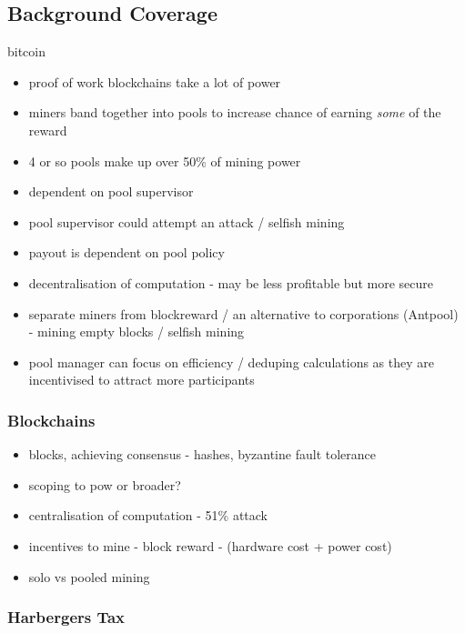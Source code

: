\subsection{Background Coverage}

bitcoin \cite{nakamoto2012bitcoin}

\begin{itemize}
  \item proof of work blockchains take a lot of power 
  \item miners band together into pools to increase chance of earning \textit{some} of the reward
  \item 4 or so pools make up over 50\% of mining power 
  \item dependent on pool supervisor
  \item pool supervisor could attempt an attack / selfish mining
  \item payout is dependent on pool policy
\end{itemize}

\begin{itemize}
  \item decentralisation of computation - may be less profitable but more secure
  \item separate miners from blockreward / an alternative to corporations (Antpool) - mining empty blocks / selfish mining
  \item pool manager can focus on efficiency / deduping calculations as they are incentivised to attract more participants
\end{itemize}

\subsubsection{Blockchains}

\begin{itemize}
  \item blocks, achieving consensus - hashes, byzantine fault tolerance
  \item scoping to pow or broader?
  \item centralisation of computation - 51\% attack
  \item incentives to mine - block reward - (hardware cost + power cost)
  \item solo vs pooled mining
\end{itemize}

\subsubsection{Harbergers Tax}

